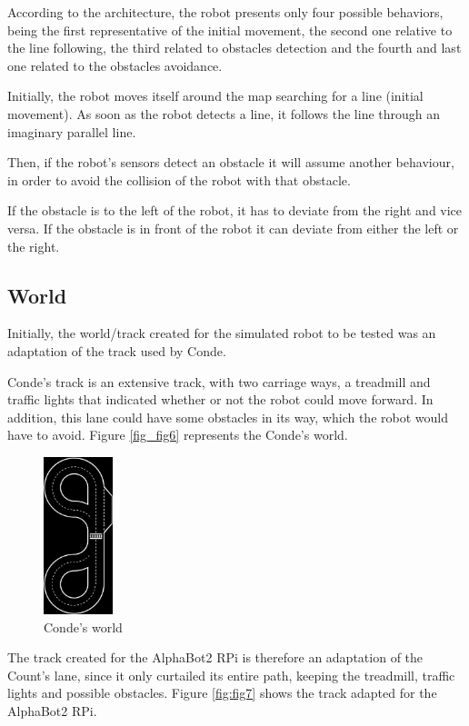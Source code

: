 \documentclass[conference]{IEEEtran}
\begin{document}
According to the architecture, the robot presents only four possible behaviors, being the first representative of the initial movement, the second one relative to the line following, the third related to obstacles detection and the fourth and last one related to the obstacles avoidance.

Initially, the robot moves itself around the map searching for a line (initial movement). As soon as the robot detects a line, it follows the line through an imaginary parallel line. 

Then, if the robot's sensors detect an obstacle it will assume another behaviour, in order to avoid the collision of the robot with that obstacle.

If the obstacle is to the left of the robot, it has to deviate from the right and vice versa. If the obstacle is in front of the robot it can deviate from either the left or the right.

\subsection{World} \label{world}

Initially, the world/track created for the simulated robot to be tested was an adaptation of the track used by Conde\cite{b1, b2, b3}.

Conde's track is an extensive track, with two carriage ways, a treadmill and traffic lights that indicated whether or not the robot could move forward. In addition, this lane could have some obstacles in its way, which the robot would have to avoid. Figure \ref{fig_fig6} represents the Conde's world.

\begin{figure}[H]
    \centering
    \includegraphics[width=2cm]{Conde-track.png}
    \caption{Conde's world}
    \label{fig:fig6}
\end{figure}

The track created for the AlphaBot2 RPi is therefore an adaptation of the Count's lane, since it only curtailed its entire path, keeping the treadmill, traffic lights and possible obstacles. Figure \ref{fig:fig7} shows the track adapted for the AlphaBot2 RPi.
\end{document}
